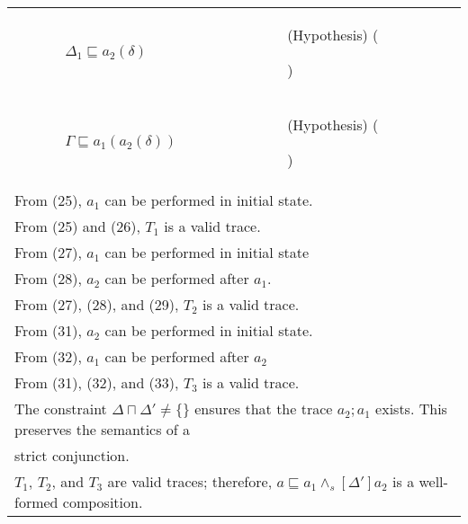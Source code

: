 \documentclass[12pt,journal,letterpaper,onecolumn]{IEEEtran}
\newcounter{myCounter}
\renewcommand{\themyCounter}{\arabic{myCounter}\addtocounter{myCounter}{1}}
\begin{document}
\begin{minipage}{6in}
\begin{center}
\begin{tabular}{llp{7.5cm}p{3.8cm}}
& & $\Delta_1 \sqsubseteq a_2(\delta)$& (Hypothesis)  \hfill(\themyCounter)  \\

& & $\Gamma \sqsubseteq a_1(a_2(\delta))$ & (Hypothesis)  \hfill(\themyCounter) \\

\multicolumn{4}{l}{From (25), $a_1$ can be performed in initial state.}\\
\multicolumn{4}{l}{From (25) and (26), $T_1$ is a valid trace.}\\
\multicolumn{4}{l}{From (27), $a_1$ can be performed in initial state}\\
\multicolumn{4}{l}{From (28), $a_2$ can be performed after $a_1$. }\\
\multicolumn{4}{l}{From (27), (28), and (29), $T_2$ is a valid trace.}\\
\multicolumn{4}{l}{From (31), $a_2$ can be performed in initial state.}\\
\multicolumn{4}{l}{From (32), $a_1$ can be performed after $a_2$}\\
\multicolumn{4}{l}{From (31), (32), and (33), $T_3$ is a valid trace.}\\
\multicolumn{4}{l}{The constraint $\Delta \sqcap \Delta' \neq \{\}$ ensures that the trace $a_2;a_1$ exists. This preserves the semantics of a}\\
\multicolumn{4}{l}{strict conjunction.}\\
\multicolumn{4}{l}{$T_1$, $T_2$, and $T_3$ are valid traces;
therefore, $a\sqsubseteq a_1\wedge_s[\Delta']a_2$ is a well-formed
composition.}\hfill$\Box$
\end{tabular}
\end{center}
\end{minipage}\\
\end{document}
